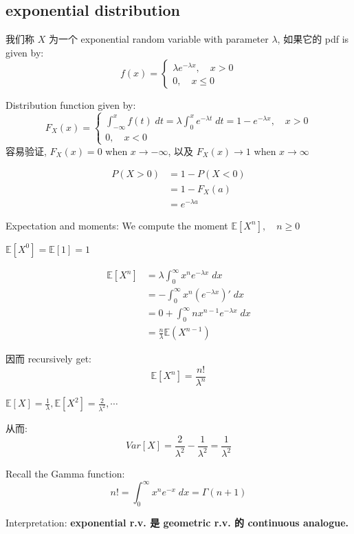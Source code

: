 \subsection{exponential distribution}

我们称 $X$ 为一个 exponential random variable with parameter $\lambda$, 如果它的 pdf is given by: \[
f(x) = \begin{cases}
    \lambda e^{-\lambda x}, \quad x > 0\\
    0, \quad x \leq 0
\end{cases}
\]


Distribution function given by: \[
F_X(x) = \begin{cases}
    \int _{-\infty}^x f(t) \; dt = \lambda \int_0 ^x e^{-\lambda t} \; dt = 1 - e^{-\lambda x}, \quad x> 0\\
    0,\quad x<0
\end{cases}
\]
容易验证, $F_X(x) =0$ when $x \to -\infty$, 以及 $F_X(x) \to 1$ when $x \to \infty$

\begin{align}
P(X> 0)& = 1 - P(X<0)      \\
&= 1- F_X(a) \\
&= e^{-\lambda a}
\end{align}


Expectation and moments: 
We compute the moment $\mathbb{E}[X^n], \quad n\geq 0$

$\mathbb{E}[X^0] = \mathbb{E}[1] = 1$

\begin{align}
\mathbb{E}[X^n] &= \lambda \int_0^\infty x^n e^{-\lambda x } \; dx  \\
&= - \int_0 ^\infty  x^n(e^{-\lambda x})' \; dx \\
&=  0 + \int_0 ^\infty n x^{n-1} e^{-\lambda x} \; dx \\
&= \frac{n}{\lambda} \mathbb{E}(X^{n-1})
\end{align}

因而 recursively get: \[
\mathbb{E}[X^n] = \frac{n!}{\lambda^n}
\]

\(\mathbb{E}[X] = \frac{1}{\lambda}, \mathbb{E}[X^2] = \frac{2}{\lambda^2}, \cdots  \)


从而: \[
Var[X] = \frac{2}{\lambda^2} - \frac{1}{\lambda^2} = \frac{1}{\lambda^2}
\]


Recall the Gamma function: \[
n!  = \int_0^\infty x^n e^{-x} \; dx  = \Gamma(n+1) \]


Interpretation: \textbf{exponential r.v. 是 geometric r.v. 的 continuous analogue.}


